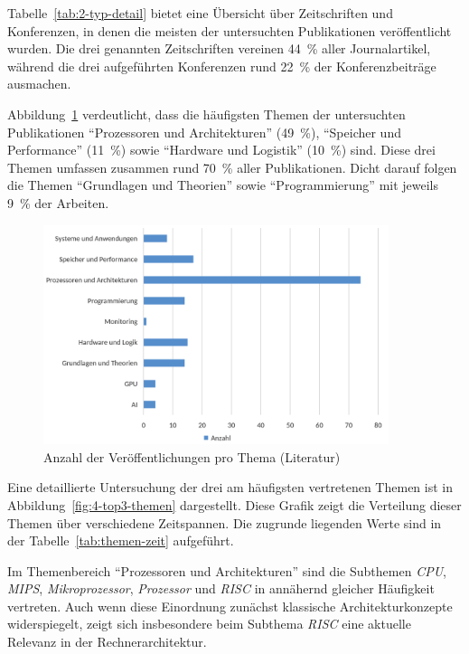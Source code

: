 Tabelle~\ref{tab:2-typ-detail} bietet eine Übersicht über Zeitschriften und Konferenzen, in denen die meisten der untersuchten Publikationen veröffentlicht wurden. Die drei genannten Zeitschriften vereinen 44~\% aller Journalartikel, während die drei aufgeführten Konferenzen rund 22~\% der Konferenzbeiträge ausmachen.

Abbildung~\ref{fig:3-anzahl-themen} verdeutlicht, dass die häufigsten Themen der untersuchten Publikationen \enquote{Prozessoren und Architekturen} (49~\%), \enquote{Speicher und Performance} (11~\%) sowie \enquote{Hardware und Logistik} (10~\%) sind. Diese drei Themen umfassen zusammen rund 70~\% aller Publikationen. Dicht darauf folgen die Themen \enquote{Grundlagen und Theorien} sowie \enquote{Programmierung} mit jeweils 9~\% der Arbeiten.

\begin{figure}[!h]
    \centering
    \includegraphics[width=0.90\textwidth]{graphics_lit/3-thema.png}
    \caption{Anzahl der Veröffentlichungen pro Thema (Literatur)}
    \label{fig:3-anzahl-themen}
\end{figure}

Eine detaillierte Untersuchung der drei am häufigsten vertretenen Themen ist in Abbildung~\ref{fig:4-top3-themen} dargestellt. Diese Grafik zeigt die Verteilung dieser Themen über verschiedene Zeitspannen. Die zugrunde liegenden Werte sind in der Tabelle~\ref{tab:themen-zeit} aufgeführt.

Im Themenbereich \enquote{Prozessoren und Architekturen} sind die Subthemen \textit{CPU}, \textit{MIPS}, \textit{Mikroprozessor}, \textit{Prozessor} und \textit{RISC} in annähernd gleicher Häufigkeit vertreten. Auch wenn diese Einordnung zunächst klassische Architekturkonzepte widerspiegelt, zeigt sich insbesondere beim Subthema \textit{RISC} eine aktuelle Relevanz in der Rechnerarchitektur.

